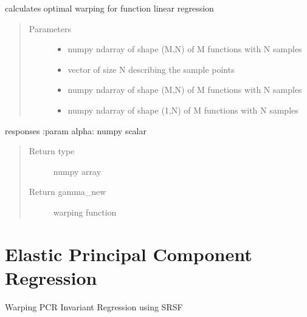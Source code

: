 \documentclass[letterpaper,10pt,english]{sphinxmanual}
\begin{document}
\begin{fulllineitems}
\label{\detokenize{regression:regression.regression_warp}}
calculates optimal warping for function linear regression
\begin{quote}\begin{description}
\item[{Parameters}] \leavevmode\begin{itemize}
\item {} 
 \textendash{} numpy ndarray of shape (M,N) of M functions with N samples

\item {} 
 \textendash{} vector of size N describing the sample points

\item {} 
 \textendash{} numpy ndarray of shape (M,N) of M functions with N samples

\item {} 
 \textendash{} numpy ndarray of shape (1,N) of M functions with N samples

\end{itemize}

\end{description}\end{quote}

responses
:param alpha: numpy scalar
\begin{quote}\begin{description}
\item[{Return type}] \leavevmode
numpy array

\item[{Return gamma\_new}] \leavevmode
warping function

\end{description}\end{quote}

\end{fulllineitems}



\chapter{Elastic Principal Component Regression}
\label{\detokenize{pcr_regression:module-pcr_regression}}\label{\detokenize{pcr_regression:elastic-principal-component-regression}}\label{\detokenize{pcr_regression::doc}}
Warping PCR Invariant Regression using SRSF
\end{document}
